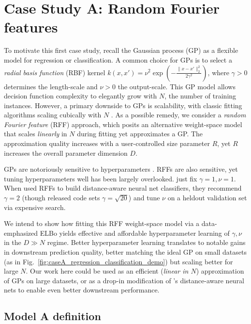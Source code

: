 

\section{Case Study A: Random Fourier features}

To motivate this first case study, recall the Gaussian process (GP) \citep{rasmussen2006gaussian} as a flexible model for regression or classification.
A common choice for GPs is to select a \emph{radial basis function} (RBF) kernel $k(x, x') = \nu^2 \exp \left(- \frac{\|x - x'\|_2^2}{2\gamma^2} \right)$, where $\gamma > 0$ determines the length-scale and $\nu > 0$ the output-scale. 
This GP model allows decision function complexity to elegantly grow with $N$, the number of training instances.  However, a primary downside to GPs is scalability, with classic fitting algorithms scaling cubically with $N$ \citep{rasmussen2006gaussian}. As a possible remedy, we consider a \emph{random Fourier feature} (RFF) \citep{rahimi2007random} approach, which posits an alternative weight-space model that scales \emph{linearly} in $N$ during fitting yet approximates a GP. The approximation quality increases with a user-controlled size parameter $R$, yet $R$ increases the overall parameter dimension $D$. 

GPs are notoriously sensitive to hyperparameters \citep{rasmussen2006Varying}. RFFs are also sensitive, yet tuning hyperparameters well has been largely overlooked. \citet{rahimi2007random} just fix $\gamma = 1,\nu=1$. When \citet{liu2020simple,liu2023simple} used RFFs to build distance-aware neural net classifiers, they recommend $\gamma = 2$ (though released code sets $\gamma = \sqrt{20}$) and tune $\nu$ on a heldout validation set via expensive search. 

We intend to show how fitting this RFF weight-space model via a data-emphasized ELBo yields effective and affordable hyperparameter learning of $\gamma, \nu$ in the $D \gg N$ regime. Better hyperparameter learning translates to notable gains in downstream prediction quality, better matching the ideal GP on small datasets (as in Fig.~\ref{fig:caseA_regression_classification_demo}) but scaling better for large $N$. Our work here could be used as an efficient (\emph{linear in $N$}) approximation of GPs on large datasets, or as a drop-in modification of \citeauthor{liu2020simple}'s distance-aware neural nets to enable even better downstream performance.

\subsection{Model A definition}
\label{sec:caseA_model}

